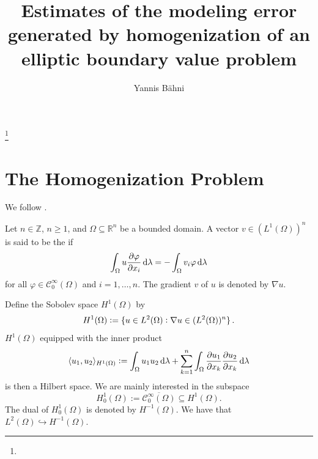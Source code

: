 
\newcommand{\Ascr}{\mathscr{A}}
\newcommand{\pot}{\mathrm{pot}}



\begin{abstract}

\end{abstract}

\title{Estimates of the modeling error generated by homogenization of an elliptic boundary value problem}
\author{Yannis B\"{a}hni}
\address[Yannis B\"{a}hni]{University of Zurich, R\"{a}mistrasse 71, 8006 Zurich}
\thanks{}
\maketitle

\tableofcontents

\section{The Homogenization Problem}
We follow \cite[1--30]{jikov:homogenization:1994}.

\begin{definition}
Let $n \in \mathbb{Z}$, $n \geq 1$, and $\Omega \subseteq \mathbb{R}^n$ be a bounded domain. A vector $v \in (L^1(\Omega))^n$ is said to be the  if
\begin{equation}
\int_\Omega u \frac{\partial \varphi}{\partial x_i}\mathop{}\!\mathrm{d} \lambda = -\int_\Omega v_i \varphi\mathop{}\!\mathrm{d} \lambda
\end{equation} 
\noindent for all $\varphi \in \mathscr{C}^\infty_0(\Omega)$ and $i = 1,\dots,n$. The gradient $v$ of $u$ is denoted by $\nabla u$. 
\end{definition}

Define the Sobolev space $H^1(\Omega)$ by
\begin{equation}
H^1(\Omega) := \cbr[0]{u \in L^2(\Omega) : \nabla u \in (L^2(\Omega))^n}.
\end{equation}
$H^1(\Omega)$ equipped with the inner product
\begin{equation}
\langle u_1,u_2 \rangle_{H^1(\Omega)} := \int_\Omega u_1u_2 \mathop{}\!\mathrm{d} \lambda + \sum_{k = 1}^n\int_\Omega \frac{\partial u_1}{\partial x_k}\frac{\partial u_2}{\partial x_k}\mathop{}\!\mathrm{d} \lambda 
\end{equation}
\noindent is then a Hilbert space. We are mainly interested in the subspace
\begin{equation}
H^1_0(\Omega) := \overline{\mathscr{C}^\infty_0(\Omega)} \subseteq H^1(\Omega).
\end{equation}
The dual of $H^1_0(\Omega)$ is denoted by $H^{-1}(\Omega)$. We have that $L^2(\Omega) \hookrightarrow H^{-1}(\Omega)$.

